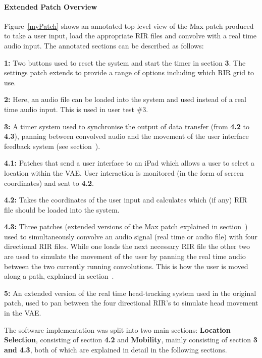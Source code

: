 \documentclass[../../main.tex]{subfiles}
\begin{document}
			\paragraph{Extended Patch Overview}
				Figure~\ref{myPatch} shows an annotated top level view of the Max patch produced to take a user input, load the appropriate \ac{RIR} files and convolve with a real time audio input. The annotated sections can be described as follows:

				\textbf{1:} Two buttons used to reset the system and start the timer in section \textbf{3}. The settings patch extends to provide a range of options including which \ac{RIR} grid to use.

				\textbf{2:} Here, an audio file can be loaded into the system and used instead of a real time audio input. This is used in user test \#3.

				\textbf{3:} A timer system used to synchronise the output of data transfer (from \textbf{4.2} to \textbf{4.3}), panning between convolved audio and the movement of the user interface feedback system (see section~).

				\textbf{4.1:} Patches that send a user interface to an iPad which allows a user to select a location within the \ac{VAE}. User interaction is monitored (in the form of screen coordinates) and sent to \textbf{4.2}.

				\textbf{4.2:} Takes the coordinates of the user input and calculates which (if any) \ac{RIR} file should be loaded into the system.

				\textbf{4.3:} Three patches (extended versions of the Max patch explained in section~) used to simultaneously convolve an audio signal (real time or audio file) with four directional \ac{RIR} files. While one loads the next necessary \ac{RIR} file the other two are used to simulate the movement of the user by panning the real time audio between the two currently running convolutions. This is how the user is moved along a path, explained in section~.

				\textbf{5:} An extended version of the real time head-tracking system used in the original patch, used to pan between the four directional \ac{RIR}'s to simulate head movement in the \ac{VAE}.
		

				The software implementation was split into two main sections: \textbf{Location Selection}, consisting of section \textbf{4.2} and \textbf{Mobility}, mainly consisting of section \textbf{3 and 4.3}, both of which are explained in detail in the following sections.
\end{document}
